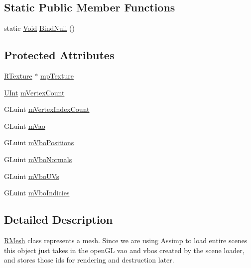 \subsection*{Static Public Member Functions}
\begin{DoxyCompactItemize}
\item 
static \hyperlink{_basic_types_8hpp_afdf0f22c576e6ee1b982f64b839c4bea}{Void} \hyperlink{classgl_1_1_r_mesh_ac8e930f887c2b59eff37b7722115bd4f}{Bind\-Null} ()
\end{DoxyCompactItemize}
\subsection*{Protected Attributes}
\begin{DoxyCompactItemize}
\item 
\hyperlink{classgl_1_1_r_texture}{R\-Texture} $\ast$ \hyperlink{classgl_1_1_r_mesh_a409110e20a5f2d2a39229f6f71445b53}{mp\-Texture}
\item 
\hyperlink{_basic_types_8hpp_a11c112f01a7ad8f767fd48bc916463a3}{U\-Int} \hyperlink{classgl_1_1_r_mesh_a4edcf25786adf2e264c61c6b8d7f401f}{m\-Vertex\-Count}
\item 
G\-Luint \hyperlink{classgl_1_1_r_mesh_afdfd8a88b91096eb4b23ca9786587c61}{m\-Vertex\-Index\-Count}
\item 
G\-Luint \hyperlink{classgl_1_1_r_mesh_a9667468e4f7e16f934a155bd28954e7d}{m\-Vao}
\item 
G\-Luint \hyperlink{classgl_1_1_r_mesh_a89115eb9f8ee1ebd8dc55e68f886170a}{m\-Vbo\-Positions}
\item 
G\-Luint \hyperlink{classgl_1_1_r_mesh_a5efc2fecfc6da14de8008b1e04694fb8}{m\-Vbo\-Normals}
\item 
G\-Luint \hyperlink{classgl_1_1_r_mesh_aff4a64a5d46ccd3e1ca67cad783765d7}{m\-Vbo\-U\-Vs}
\item 
G\-Luint \hyperlink{classgl_1_1_r_mesh_a1f5091fc89b32918e1a4cc92ec41a852}{m\-Vbo\-Indicies}
\end{DoxyCompactItemize}


\subsection{Detailed Description}
\hyperlink{classgl_1_1_r_mesh}{R\-Mesh} class represents a mesh. Since we are using Assimp to load entire scenes this object just takes in the open\-G\-L vao and vbos created by the scene loader, and stores those ids for rendering and destruction later. 

